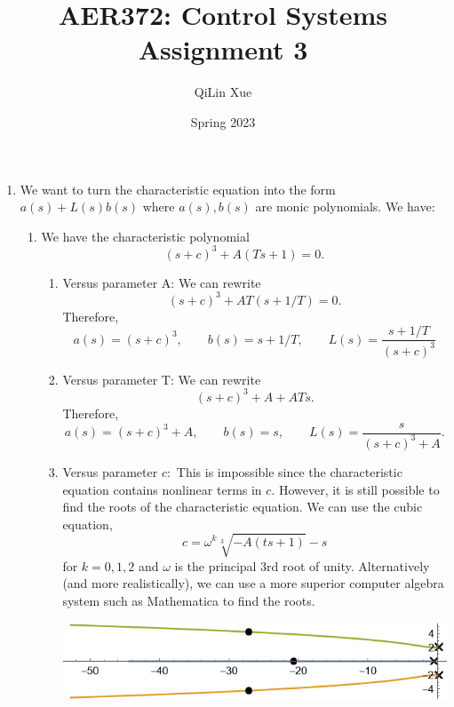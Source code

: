 \documentclass{article}
\title{AER372: Control Systems  \\ Assignment 3}
\author{QiLin Xue}
\date{Spring 2023}
\begin{document}
\maketitle
\begin{enumerate}[label=\textbf{3.\arabic*}]
\item We want to turn the characteristic equation into the form $a(s) + L(s)b(s)$ where $a(s),b(s)$ are monic polynomials. We have:
\begin{enumerate}[label=(\alph*)]
    \item We have the characteristic polynomial
    \begin{equation}
        (s+c)^3 + A(Ts+1)=0.
    \end{equation}
    \begin{enumerate}[label=(\roman*)]
        \item Versus parameter A: We can rewrite 
        \begin{equation}
            (s+c)^3 + AT(s+1/T)=0.
        \end{equation}
        Therefore,
        \begin{equation}
            \boxed{a(s) = (s+c)^3,\qquad b(s) = s+1/T,\qquad  L(s) = \frac{s+1/T}{(s+c)^3}}
        \end{equation}
        \item Versus parameter T: We can rewrite 
        \begin{equation}
            (s+c)^3 + A + ATs.
        \end{equation}
        Therefore,
        \begin{equation}
            \boxed{a(s) = (s+c)^3 + A,\qquad b(s) = s,\qquad  L(s) = \frac{s}{(s+c)^3 + A}}.
        \end{equation}
        \item Versus parameter $c:$ This is impossible since the characteristic equation contains nonlinear terms in $c$. However, it is still possible to find the roots of the characteristic equation. We can use the cubic equation,
        \begin{equation}
            c = \omega^k\sqrt[3]{-A(ts+1)}-s
        \end{equation}
        for $k=0,1,2$ and $\omega$ is the principal 3rd root of unity. Alternatively (and more realistically), we can use a more superior computer algebra system such as Mathematica to find the roots.
        \begin{center}
            \includegraphics[width=0.7\linewidth]{A3_imgs/q1aiii.png}

\end{center}
\end{enumerate}
\end{enumerate}
\end{enumerate}
\end{document}
